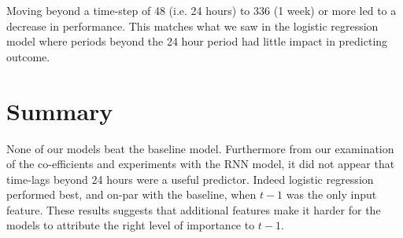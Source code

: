 Moving beyond a time-step of 48 (i.e. 24 hours) to 336 (1 week) or more led to a decrease in performance. This matches what we saw in the logistic regression model where periods beyond the 24 hour period had little impact in predicting outcome.

\section{Summary}

None of our models beat the baseline model. Furthermore from our examination of the co-efficients and experiments with the RNN model, it did not appear that time-lags beyond 24 hours were a useful predictor. Indeed logistic regression performed best, and on-par with the baseline, when $t-1$ was the only input feature. These results suggests that additional features make it harder for the models to attribute the right level of importance to $t-1$. 
